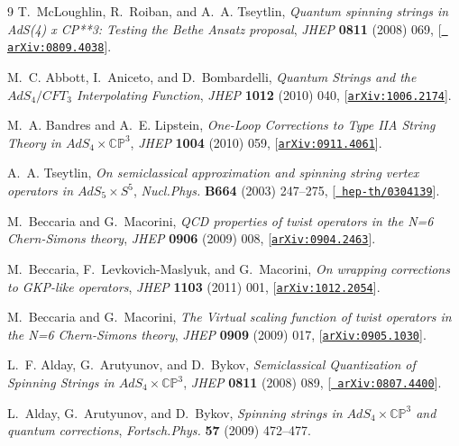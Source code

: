 \documentclass[a4paper,11pt]{article}
\numberwithin{equation}{section}
\begin{document}
\begin{thebibliography} {9}
T.~McLoughlin, R.~Roiban, and A.~A. Tseytlin, {\it {Quantum spinning strings in
  AdS(4) x CP**3: Testing the Bethe Ansatz proposal}},  {\em JHEP} {\bf 0811}
  (2008) 069, [\href{http://xxx.lanl.gov/abs/0809.4038}{{\tt
  arXiv:0809.4038}}].

M.~C. Abbott, I.~Aniceto, and D.~Bombardelli, {\it {Quantum Strings and the
  $AdS_4/CFT_3$ Interpolating Function}},  {\em JHEP} {\bf 1012} (2010) 040,
  [\href{http://xxx.lanl.gov/abs/1006.2174}{{\tt arXiv:1006.2174}}].

M.~A. Bandres and A.~E. Lipstein, {\it {One-Loop Corrections to Type IIA String
  Theory in $AdS_{4}\times\mathbb{CP}^{3}$}},  {\em JHEP} {\bf 1004} (2010)
  059, [\href{http://xxx.lanl.gov/abs/0911.4061}{{\tt arXiv:0911.4061}}].

A.~A. Tseytlin, {\it {On semiclassical approximation and spinning string vertex
  operators in $AdS_{5}\times S^{5}$}},  {\em Nucl.Phys.} {\bf B664} (2003)
  247--275, [\href{http://xxx.lanl.gov/abs/hep-th/0304139}{{\tt
  hep-th/0304139}}].

M.~Beccaria and G.~Macorini, {\it {QCD properties of twist operators in the N=6
  Chern-Simons theory}},  {\em JHEP} {\bf 0906} (2009) 008,
  [\href{http://xxx.lanl.gov/abs/0904.2463}{{\tt arXiv:0904.2463}}].

M.~Beccaria, F.~Levkovich-Maslyuk, and G.~Macorini, {\it {On wrapping
  corrections to GKP-like operators}},  {\em JHEP} {\bf 1103} (2011) 001,
  [\href{http://xxx.lanl.gov/abs/1012.2054}{{\tt arXiv:1012.2054}}].

M.~Beccaria and G.~Macorini, {\it {The Virtual scaling function of twist
  operators in the N=6 Chern-Simons theory}},  {\em JHEP} {\bf 0909} (2009)
  017, [\href{http://xxx.lanl.gov/abs/0905.1030}{{\tt arXiv:0905.1030}}].

L.~F. Alday, G.~Arutyunov, and D.~Bykov, {\it {Semiclassical Quantization of
  Spinning Strings in $AdS_{4}\times \mathbb{CP}^{3}$}},  {\em JHEP} {\bf 0811}
  (2008) 089, [\href{http://xxx.lanl.gov/abs/0807.4400}{{\tt
  arXiv:0807.4400}}].

L.~Alday, G.~Arutyunov, and D.~Bykov, {\it {Spinning strings in $AdS_{4}\times
  \mathbb{CP}^{3}$ and quantum corrections}},  {\em Fortsch.Phys.} {\bf 57}
  (2009) 472--477.

\end{thebibliography}
  
\end{document}
